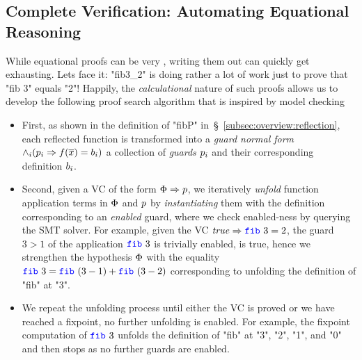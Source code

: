 \subsection{Complete Verification: Automating Equational Reasoning}
\label{sec:overview:pbe}

While equational proofs can be
very \elegant, writing them out
can quickly get exhausting.
%
Lets face it: "fib3_2" is doing
rather a lot of work just to
prove that "fib 3" equals "2"!
%
Happily, the \emph{calculational}
nature of such proofs allows us
to develop the following proof
search algorithm \pbesym that
is inspired by model checking~\cite{CGL92}
%
\begin{itemize}[leftmargin=*]
\item {}
%
First, as shown in the definition
of "fibP" in~\S~\ref{subsec:overview:reflection}, each reflected
function is transformed into a
\emph{guard normal form}
%
$\wedge_i (p_i \Rightarrow f({\overline{x}}) = b_i)$
%
\ie a collection of \emph{guards} $p_i$
and their corresponding definition $b_i$.

\item {}
Second, given a VC of the form
$\Phi \Rightarrow p$,
we iteratively \emph{unfold}
function application terms in
$\Phi$ and $p$ by
\emph{instantiating} them with
the definition corresponding to
an \emph{enabled} guard, where
we check enabled-ness by
querying the SMT solver.
%
For example, given the VC
$\ttrue \Rightarrow \fib{3} = 2$,
the guard $3 > 1$ of the application $\fib{3}$ is
trivially enabled,
\ie is true, hence we
strengthen the hypothesis
$\Phi$ with the equality
$\fib{3} = \fib{(3-1)} + \fib{(3-2)}$
corresponding to unfolding the
definition of "fib" at "3".

\item {}
%
We repeat the unfolding process
until either the VC is proved
or we have reached a fixpoint,
\ie no further unfolding is
enabled.
%
For example, the fixpoint
computation of $\fib{3}$ unfolds the definition
of "fib" at "3", "2", "1", and "0"
and then stops as no further
guards are enabled.
\end{itemize}



